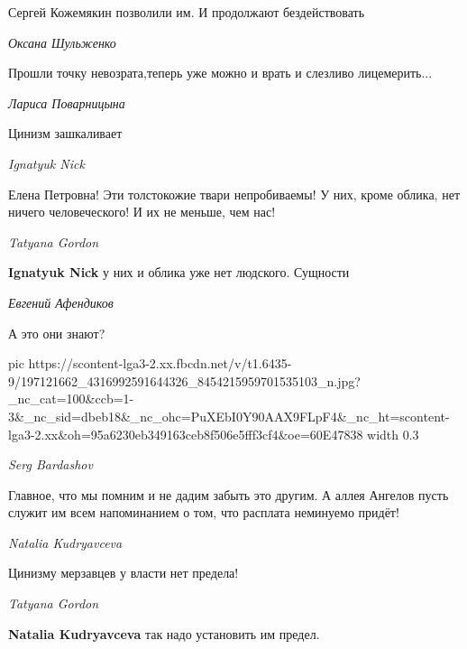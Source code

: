 Сергей Кожемякин позволили им. И продолжают бездействовать

\emph{Оксана Шульженко}

Прошли точку невозрата,теперь уже можно и врать и слезливо лицемерить...

\emph{Лариса Поварницына}

Цинизм зашкаливает

\emph{Ignatyuk Nick}

Елена Петровна!  Эти толстокожие твари непробиваемы! У них, кроме облика, нет
ничего человеческого! И их не меньше, чем нас!

\emph{Tatyana Gordon}

\textbf{Ignatyuk Nick} у них и облика уже нет людского. Сущности

\emph{Евгений Афендиков}

А это они знают?

\ifcmt
  pic https://scontent-lga3-2.xx.fbcdn.net/v/t1.6435-9/197121662_4316992591644326_8454215959701535103_n.jpg?_nc_cat=100&ccb=1-3&_nc_sid=dbeb18&_nc_ohc=PuXEbI0Y90AAX9FLpF4&_nc_ht=scontent-lga3-2.xx&oh=95a6230eb349163ceb8f506e5fff3cf4&oe=60E47838
	width 0.3
\fi

\emph{Serg Bardashov}

Главное, что мы помним и не дадим забыть это другим. А аллея Ангелов пусть
служит им всем напоминанием о том, что расплата неминуемо придёт!

\emph{Natalia Kudryavceva}

Цинизму мерзавцев у власти нет предела!

\emph{Tatyana Gordon}

\textbf{Natalia Kudryavceva} так надо установить им предел.

